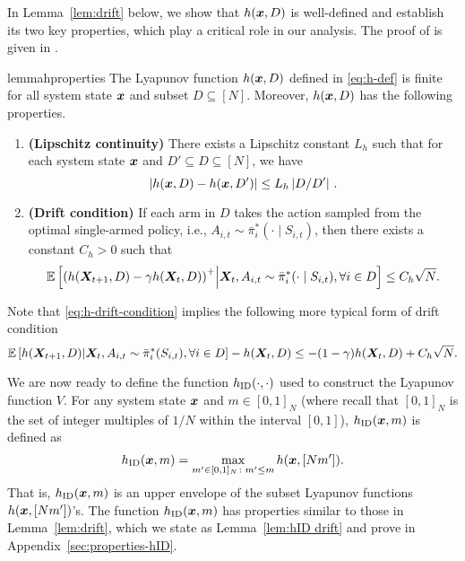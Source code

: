 \documentclass[11pt,letterpaper]{article}
\begin{document}
In Lemma~\ref{lem:drift} below, we show that $h(\bm{x},D)$ is well-defined and establish its two key properties, which play a critical role in our analysis.  The proof of  is given in .
\begin{restatable}{lemma}{hproperties}\label{lem:drift}
The Lyapunov function $h(\bm{x}, D)$ defined in \eqref{eq:h-def} is finite for all system state $\bm{x}$ and subset $D\subseteq[N]$. 
Moreover, $h(\bm{x}, D)$ has the following properties.
\begin{enumerate}
    \item \textbf{(Lipschitz continuity)} There exists a Lipschitz constant $L_h$ such that for each system state $\bm{x}$ and $D'\subseteq D\subseteq [N]$, we have
    \begin{equation}
        \label{eq:h-lipschitz}
        \left\lvert h(\bm{x},D)-h(\bm{x},D')\right\rvert\leq L_h\left\lvert D/D'\right\rvert\,.
    \end{equation}
    \item \textbf{(Drift condition)} If each arm in $D$ takes the action sampled from the optimal single-armed policy, i.e., ${A}_{i,t}\sim\bar{\pi}_i^*(\cdot\mid S_{i,t})$, then there exists a constant $C_h > 0$ such that
    \begin{equation}
        \label{eq:h-drift-condition}
        \mathbb{E}\left[\left(h({\bm{X}}_{t+1},D)-\gamma h({\bm{X}}_t,D)\right)^+\middle|{\bm{X}}_t,{A}_{i,t}\sim\bar{\pi}_i^*(\cdot\mid S_{i,t}),\forall i\in D\right]\leq C_h\sqrt{N}.
    \end{equation}
\end{enumerate}
\end{restatable}
Note that \eqref{eq:h-drift-condition} implies the following more typical form of drift condition
\begin{equation}
    \mathbb{E}\left[h({\bm{X}}_{t+1},D)\middle |{\bm{X}}_t,{A}_{i,t}\sim\bar{\pi}_i^*(S_{i,t}),\forall i\in D\right]-h({\bm{X}}_{t},D)\leq -(1-\gamma)h({\bm{X}}_{t},D)+C_h\sqrt{N}.
\end{equation}


We are now ready to define the function $h_{\textnormal{ID}}(\cdot,\cdot)$ used to construct the Lyapunov function $V$.
For any system state $\bm{x}$ and $m\in[0,1]_N$ (where recall that $[0,1]_N$ is the set of integer multiples of $1/N$ within the interval $[0,1]$), $h_{\textnormal{ID}}(\bm{x},m)$ is defined as
\begin{equation}
    \label{eq:hid-def}
    h_{\textnormal{ID}}(\bm{x},m)=\max_{m'\in[0,1]_N\colon m'\leq m} h(\bm{x},[Nm']).
\end{equation}
That is, $h_{\textnormal{ID}}(\bm{x},m)$ is an upper envelope of the subset Lyapunov functions $h(\bm{x},[Nm'])$'s.
The function $h_{\textnormal{ID}}(\bm{x},m)$ has properties similar to those in Lemma~\ref{lem:drift}, which we state as Lemma~\ref{lem:hID drift} and prove in Appendix~\ref{sec:properties-hID}.
\end{document}
